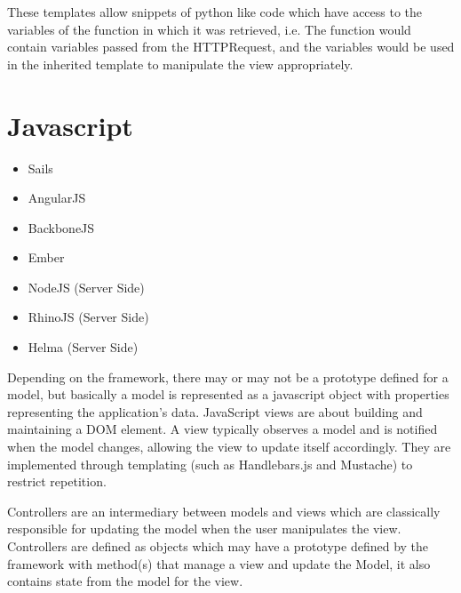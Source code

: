 These templates allow snippets of python like code which have access to the variables of the function in which it was retrieved, i.e.
The function would contain variables passed from the HTTPRequest, and the variables would be used in the inherited template to manipulate
the view appropriately. \newpage

\section{Javascript}

\begin{itemize}
  \item Sails
  \item AngularJS
  \item BackboneJS
  \item Ember
  \item NodeJS (Server Side)
  \item RhinoJS  (Server Side)
  \item Helma (Server Side)
\end{itemize}

\par Depending on the framework, there may or may not be a prototype defined for a model, but basically a model is represented as a javascript object with properties representing the application's data.
JavaScript views are about building and maintaining a DOM element.
A view typically observes a model and is notified when the model changes, allowing the view to update itself accordingly. They are implemented through templating (such as Handlebars.js and Mustache) to restrict repetition.
\par Controllers are an intermediary between models and views which are classically responsible for updating the model when the user manipulates the view. Controllers are defined as objects which may have a prototype defined by the framework with method(s) that manage a view and update the Model, it also contains state from the model for the view.

